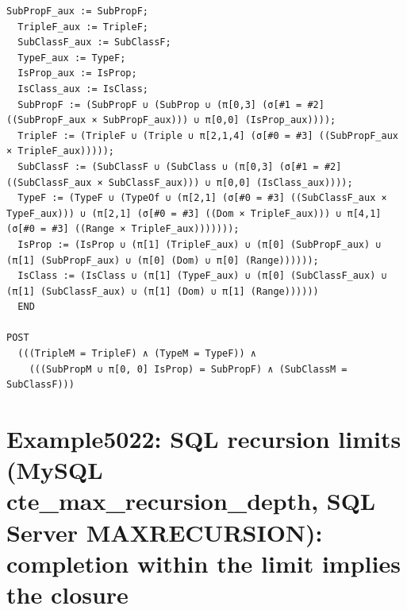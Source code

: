 \documentclass[10pt]{article}
\begin{document}
\begin{Verbatim}[fontsize=\tiny,breaklines=true,breakanywhere=true,frame=single,framesep=1.5mm]
  SubPropF_aux := SubPropF;
  TripleF_aux := TripleF;
  SubClassF_aux := SubClassF;
  TypeF_aux := TypeF;
  IsProp_aux := IsProp;
  IsClass_aux := IsClass;
  SubPropF := (SubPropF ∪ (SubProp ∪ (π[0,3] (σ[#1 = #2] ((SubPropF_aux × SubPropF_aux))) ∪ π[0,0] (IsProp_aux))));
  TripleF := (TripleF ∪ (Triple ∪ π[2,1,4] (σ[#0 = #3] ((SubPropF_aux × TripleF_aux)))));
  SubClassF := (SubClassF ∪ (SubClass ∪ (π[0,3] (σ[#1 = #2] ((SubClassF_aux × SubClassF_aux))) ∪ π[0,0] (IsClass_aux))));
  TypeF := (TypeF ∪ (TypeOf ∪ (π[2,1] (σ[#0 = #3] ((SubClassF_aux × TypeF_aux))) ∪ (π[2,1] (σ[#0 = #3] ((Dom × TripleF_aux))) ∪ π[4,1] (σ[#0 = #3] ((Range × TripleF_aux)))))));
  IsProp := (IsProp ∪ (π[1] (TripleF_aux) ∪ (π[0] (SubPropF_aux) ∪ (π[1] (SubPropF_aux) ∪ (π[0] (Dom) ∪ π[0] (Range))))));
  IsClass := (IsClass ∪ (π[1] (TypeF_aux) ∪ (π[0] (SubClassF_aux) ∪ (π[1] (SubClassF_aux) ∪ (π[1] (Dom) ∪ π[1] (Range))))))
  END

POST
  (((TripleM = TripleF) ∧ (TypeM = TypeF)) ∧
    (((SubPropM ∪ π[0, 0] IsProp) = SubPropF) ∧ (SubClassM = SubClassF)))
\end{Verbatim}

\Needspace{0.45\textheight}

\section{Example5022: SQL recursion limits (MySQL cte\_max\_recursion\_depth, SQL Server MAXRECURSION): completion within the limit implies the closure}\label{case:Example5022}
\end{document}
